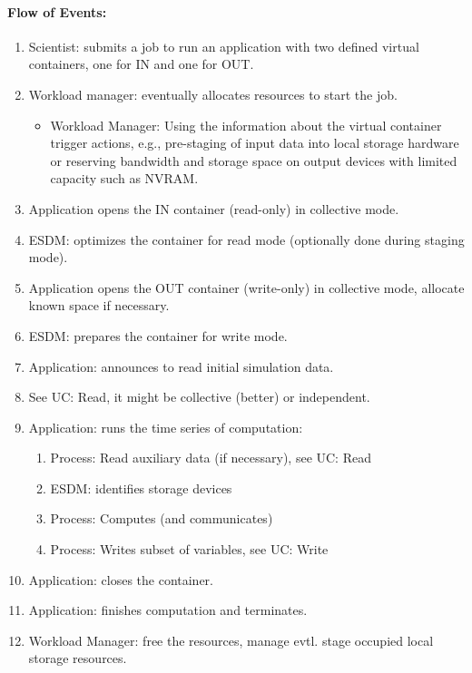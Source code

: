

\paragraph{Flow of Events:}
\begin{enumerate}
	\item Scientist: submits a job to run an application with two defined virtual containers, one for IN and one for OUT.
	\item Workload manager: eventually allocates resources to start the job.
	  \begin{itemize}
	  \item Workload Manager: Using the information about the virtual container trigger actions, e.g., pre-staging of input data into local storage hardware or reserving bandwidth and storage space on output devices with limited capacity such as NVRAM.
	  \end{itemize}
	\item Application opens the IN container (read-only) in collective mode.
	\item ESDM: optimizes the container for read mode (optionally done during staging mode).
	\item Application opens the OUT container (write-only) in collective mode, allocate known space if necessary.
	\item ESDM: prepares the container for write mode.
	\item Application: announces to read initial simulation data.
	\item See UC: Read, it might be collective (better) or independent.
	\item Application: runs the time series of computation:
	\begin{enumerate}
		\item Process: Read auxiliary data (if necessary), see UC: Read
		\item ESDM: identifies storage devices
		\item Process: Computes (and communicates)
		\item Process: Writes subset of variables, see UC: Write
	\end{enumerate}
	\item Application: closes the container.
	\item Application: finishes computation and terminates.
	\item Workload Manager: free the resources, manage evtl. stage occupied local storage resources.
\end{enumerate}


